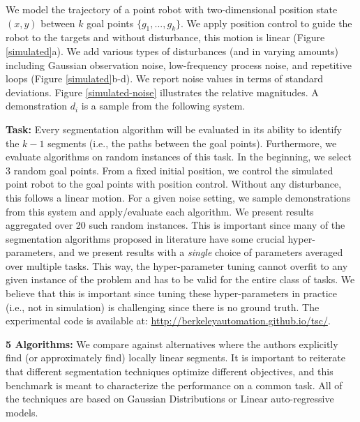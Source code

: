 We model the trajectory of a point robot with two-dimensional position state $(x,y)$ between $k$ goal points $\{g_1,...,g_k\}$. 
We apply position control to guide the robot to the targets and without disturbance, this motion is linear (Figure \ref{simulated}a).
We add various types of disturbances (and in varying amounts) including Gaussian observation noise, low-frequency process noise, and repetitive loops (Figure \ref{simulated}b-d).
We report noise values in terms of standard deviations. Figure \ref{simulated-noise} illustrates the relative magnitudes.
A demonstration $d_i$ is a sample from the following system.

\vspace{0.5em}
\noindent\textbf{Task: } Every segmentation algorithm will be evaluated in its ability to identify the $k-1$ segments (i.e., the paths between the goal points).
Furthermore, we evaluate algorithms on random instances of this task.
In the beginning, we select $3$ random goal points.
From a fixed initial position, we control the simulated point robot to the goal points with position control. 
Without any disturbance, this follows a linear motion.
For a given noise setting, we sample demonstrations from this system and apply/evaluate each algorithm.
We present results aggregated over 20 such random instances.
This is important since many of the segmentation algorithms proposed in literature have some crucial hyper-parameters, and we present results with a \emph{single} choice of parameters averaged over multiple tasks.
This way, the hyper-parameter tuning cannot overfit to any given instance of the problem and has to be valid for the entire class of tasks.
We believe that this is important since tuning these hyper-parameters in practice (i.e., not in simulation) is challenging since there is no ground truth. 
The experimental code is available at: \url{http://berkeleyautomation.github.io/tsc/}.

\vspace{0.5em}
\noindent\textbf{5 Algorithms: } We compare \tsc against alternatives where the authors explicitly find (or approximately find) locally linear segments. It is important to reiterate that different segmentation techniques optimize different objectives, and this benchmark is meant to characterize the performance on a common task. All of the techniques are based on Gaussian Distributions or Linear auto-regressive models.


